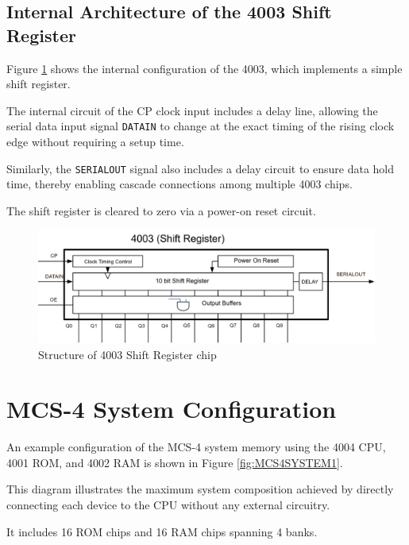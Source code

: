 \subsection{Internal Architecture of the 4003 Shift Register}

Figure \ref{fig:STRUCTURE4003} shows the internal configuration of the 4003, which implements a simple shift register.

The internal circuit of the CP clock input includes a delay line, allowing the serial data input signal \texttt{DATAIN} to change at the exact timing of the rising clock edge without requiring a setup time.

Similarly, the \texttt{SERIALOUT} signal also includes a delay circuit to ensure data hold time, thereby enabling cascade connections among multiple 4003 chips.

The shift register is cleared to zero via a power-on reset circuit.

\begin{figure}[H]
    \includegraphics[width=1.0\columnwidth]{./Figure/Structure4003.png}
    \caption{Structure of 4003 Shift Register chip}
    \label{fig:STRUCTURE4003}
\end{figure}

\section{MCS-4 System Configuration}
An example configuration of the MCS-4 system memory using the 4004 CPU, 4001 ROM, and 4002 RAM is shown in Figure \ref{fig:MCS4SYSTEM1}.  

This diagram illustrates the maximum system composition achieved by directly connecting each device to the CPU without any external circuitry.

It includes 16 ROM chips and 16 RAM chips spanning 4 banks.

